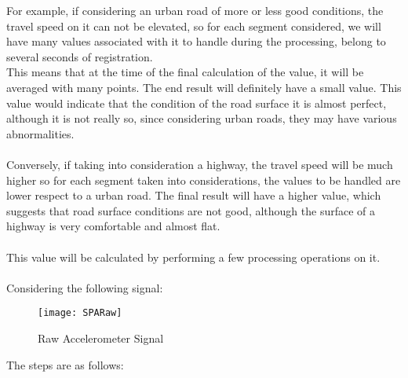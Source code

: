 \documentclass[tesi]{subfiles}
\begin{document}
\noindent For example, if considering an urban road of more or less good conditions, the travel speed on it can not be elevated, so for each segment considered, we will have many values associated with it to handle during the processing, belong to several seconds of registration.\\
\noindent This means that at the time of the final calculation of the value, it will be averaged with many points. The end result will definitely have a small value. This value would indicate that the condition of the road surface it is almost perfect, although it is not really so, since considering urban roads, they may have various abnormalities.\\\\
\noindent Conversely, if taking into consideration a highway, the travel speed will be much higher so for each segment taken into considerations, the values to be handled are lower respect to a urban road. The final result will have a higher value, which suggests that road surface conditions are not good, although the surface of a highway is very comfortable and almost flat.\\\\
\noindent This value will be calculated by performing a few processing operations on it.\\\\


\noindent Considering the following signal:
\begin{figure}[H]
\centering
\texttt{[image: SPARaw]}
\caption{Raw Accelerometer Signal}
\end{figure}

\noindent The steps are as follows:
\end{document}
